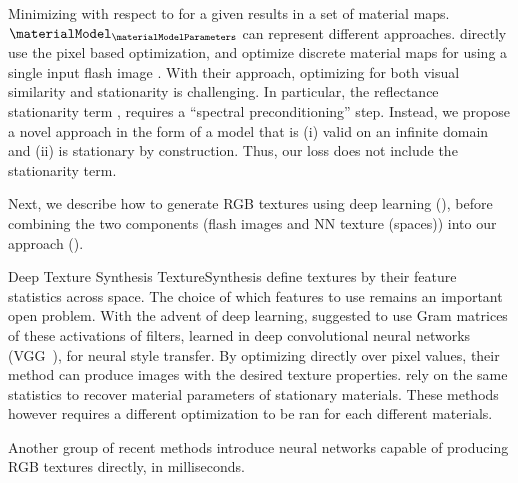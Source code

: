 \documentclass[acmtog, review, anonymous]{acmart}
\begin{document}
Minimizing \materialModelParameters with respect to  for a given \flashImage results in a set of material maps.
$\materialModel_\materialModelParameters$ can represent different approaches.
\citet{aittala2016reflectance} directly use the pixel based optimization, and optimize discrete material maps for \materialModelParameters using a single input flash image \flashImage.
With their approach, optimizing for both visual similarity and stationarity is challenging.
In particular, the reflectance stationarity term \stationarity, requires a ``spectral preconditioning'' step.
Instead, we propose a novel approach in the form of a  model \materialModel that is (i) valid on an infinite domain and (ii) is stationary by construction.
Thus, our loss does not include the stationarity term.

Next, we describe how to generate RGB textures using deep learning (), before combining the two components (flash images and NN texture (spaces)) into our approach ().



\mysubsection
{Deep Texture Synthesis}
{TextureSynthesis}
\citet{julesz1965texture} define textures by their feature statistics across space. The choice of which features to use remains an important open problem.
With the advent of deep learning, \citet{gatys2015texture} suggested to use Gram matrices of these activations of filters, learned in deep convolutional neural networks (\eg VGG~\cite{simonyan2014very}), for neural style transfer. By optimizing directly over pixel values, their method can produce images with the desired texture properties.
\citet{aittala2016reflectance} rely on the same statistics to recover material parameters of stationary materials.
These methods however requires a different optimization to be ran for each different materials.

Another group of recent methods \cite{ulyanov2016texture, johnson2016perceptual} introduce neural networks capable of producing RGB textures directly, in milliseconds.
\end{document}
